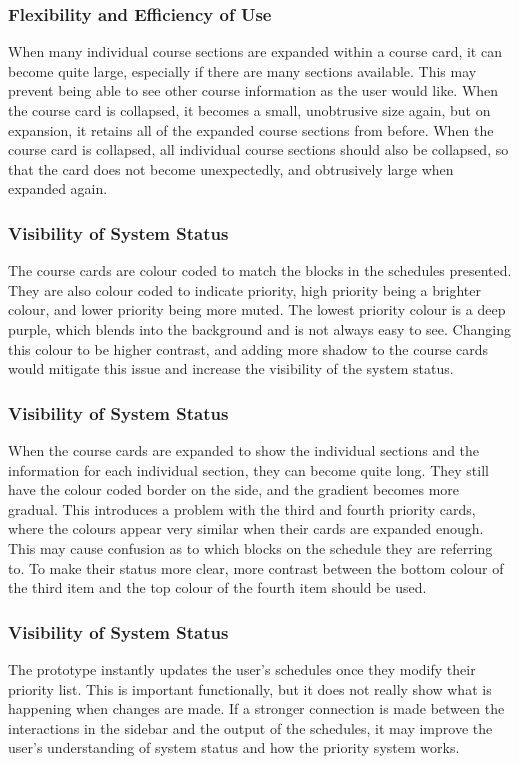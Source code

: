 \documentclass{article}
\begin{document}
\subsubsection{Flexibility and Efficiency of Use}
When many individual course sections are expanded within a course card, it can become quite large, especially if there are many sections available. This may prevent being able to see other course information as the user would like. When the course card is collapsed, it becomes a small, unobtrusive size again, but on expansion, it retains all of the expanded course sections from before. When the course card is collapsed, all individual course sections should also be collapsed, so that the card does not become unexpectedly, and obtrusively large when expanded again.




\subsubsection{Visibility of System Status}
The course cards are colour coded to match the blocks in the schedules presented. They are also colour coded to indicate priority, high priority being a brighter colour, and lower priority being more muted. The lowest priority colour is a deep purple, which blends into the background and is not always easy to see. Changing this colour to be higher contrast, and adding more shadow to the course cards would mitigate this issue and increase the visibility of the system status.


\subsubsection{Visibility of System Status}
When the course cards are expanded to show the individual sections and the information for each individual section, they can become quite long. They still have the colour coded border on the side, and the gradient becomes more gradual. This introduces a problem with the third and fourth priority cards, where the colours appear very similar when their cards are expanded enough. This may cause confusion as to which blocks on the schedule they are referring to. To make their status more clear, more contrast between the bottom colour of the third item and the top colour of the fourth item should be used.


\subsubsection{Visibility of System Status}
The prototype instantly updates the user's schedules once they modify their priority list. This is important functionally, but it does not really show what is happening when changes are made. If a stronger connection is made between the interactions in the sidebar and the output of the schedules, it may improve the user's understanding of system status and how the priority system works.
\end{document}

